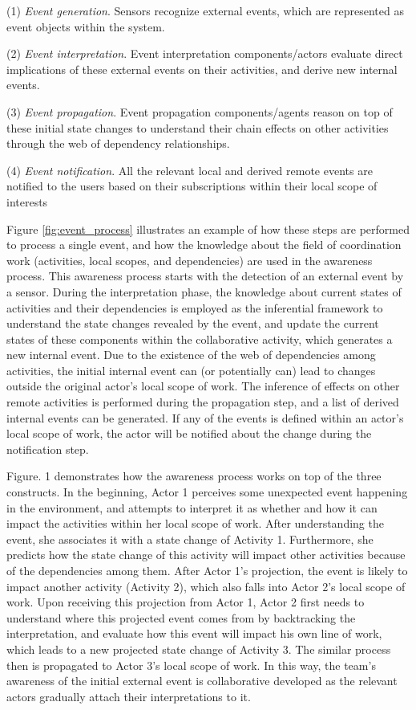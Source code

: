 (1) \emph{Event generation}. Sensors recognize external events, which are represented as event objects within the system. 

(2) \emph{Event interpretation}. Event interpretation components/actors evaluate direct implications of these external events on their activities, and derive new internal events. 

(3) \emph{Event propagation}. Event propagation components/agents reason on top of these initial state changes to understand their chain effects on other activities through the web of dependency relationships. 

(4) \emph{Event notification}. All the relevant local and derived remote events are notified to the users based on their subscriptions within their local scope of interests 

Figure \ref{fig:event_process} illustrates an example of how these steps are performed to process a single event, and how the knowledge about the field of coordination work (activities, local scopes, and dependencies) are used in the awareness process. This awareness process starts with the detection of an external event by a sensor. During the interpretation phase, the knowledge about current states of activities and their dependencies is employed as the inferential framework to understand the state changes revealed by the event, and update the current states of these components within the collaborative activity, which generates a new internal event. Due to the existence of the web of dependencies among activities, the initial internal event can (or potentially can) lead to changes outside the original actor’s local scope of work. The inference of effects on other remote activities is performed during the propagation step, and a list of derived internal events can be generated. If any of the events is defined within an actor's local scope of work, the actor will be notified about the change during the notification step.

Figure. 1 demonstrates how the awareness process works on top of the three constructs. In the beginning, Actor 1 perceives some unexpected event happening in the environment, and attempts to interpret it as whether and how it can impact the activities within her local scope of work. After understanding the event, she associates it with a state change of Activity 1. Furthermore, she predicts how the state change of this activity will impact other activities because of the dependencies among them. After Actor 1’s projection, the event is likely to impact another activity (Activity 2), which also falls into Actor 2’s local scope of work. Upon receiving this projection from Actor 1, Actor 2 first needs to understand where this projected event comes from by backtracking the interpretation, and evaluate how this event will impact his own line of work, which leads to a new projected state change of Activity 3. The similar process then is propagated to Actor 3’s local scope of work. In this way, the team’s awareness of the initial external event is collaborative developed as the relevant actors gradually attach their interpretations to it.

